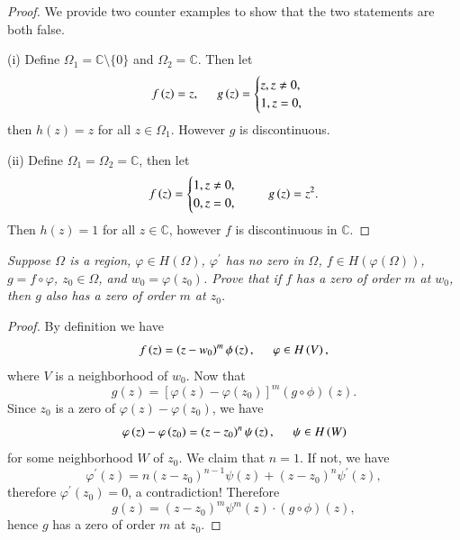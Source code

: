 \begin{proof}
We provide two counter examples to show that the two statements are both false.\par
(i) Define $\Omega_1=\mathbb{C}\setminus\{0\}$ and $\Omega_2=\mathbb{C}$. Then let 
$$
f\left( z \right) =z,\hspace{0.5cm}g\left( z \right) =\begin{cases}
	z,z\ne 0,\\
	1,z=0,\\
\end{cases}
$$
then $h(z)=z$ for all $z\in\Omega_1$. However $g$ is discontinuous.\par
(ii) Define $\Omega_1=\Omega_2=\mathbb{C}$, then let 
$$
f\left( z \right) =\begin{cases}
	1,z\ne 0,\\
	0,z=0,\\
\end{cases}\hspace{0.5cm}g\left( z \right) =z^2.
$$
Then $h(z)=1$ for all $z\in\mathbb{C}$, however $f$ is discontinuous in $\mathbb{C}$.
\end{proof}
\begin{problem}\em
Suppose $\Omega$ is a region, $\varphi\in H(\Omega)$, $\varphi^\prime$ has no zero in $\Omega$, $f\in H(\varphi(\Omega))$, $g=f\circ\varphi$, $z_0\in\Omega$, and $w_0=\varphi(z_0)$. Prove that if $f$ has a zero of order $m$ at $w_0$, then $g$ also has a zero of order $m$ at $z_0$.
\end{problem}
\begin{proof}
By definition we have 
$$
f\left( z \right) =\left( z-w_0 \right) ^m\phi \left( z \right) ,\hspace{0.5cm}\varphi \in H\left( V \right) ,
$$
where $V$ is a neighborhood of $w_0$. Now that 
$$
g\left( z \right) =\left[ \varphi \left( z \right) -\varphi \left( z_0 \right) \right] ^m\left( g\circ \phi \right) \left( z \right) .
$$
Since $z_0$ is a zero of $\varphi(z)-\varphi(z_0)$, we have 
$$
\varphi \left( z \right) -\varphi \left( z_0 \right) =\left( z-z_0 \right) ^n\psi \left( z \right) ,\hspace{0.5cm}\psi \in H\left( W \right) 
$$
for some neighborhood $W$ of $z_0$. We claim that $n=1$. If not, we have 
$$
\varphi ^{\prime}\left( z \right) =n\left( z-z_0 \right) ^{n-1}\psi \left( z \right) +\left( z-z_0 \right) ^n\psi ^{\prime}\left( z \right) ,
$$
therefore $\varphi^\prime(z_0)=0$, a contradiction! Therefore 
$$
g\left( z \right) =\left( z-z_0 \right) ^m\psi ^m\left( z \right) \cdot \left( g\circ \phi \right) \left( z \right) ,
$$
hence $g$ has a zero of order $m$ at $z_0$.
\end{proof}
